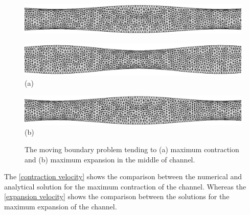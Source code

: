 \begin{figure}[H]
\begin{minipage}{.50\linewidth}
     \end{minipage}%
     \begin{minipage}{.50\linewidth}
      \centering
      \includegraphics[scale=0.16]{./02_chaps/cap_validation/figure/ext2.png}\\
     \end{minipage}
     \begin{minipage}{.50\linewidth}
     \medskip
      \centering
      \includegraphics[scale=0.16]{./02_chaps/cap_validation/figure/comp3.png}\\
     (a)
     \end{minipage}%
     \begin{minipage}{.50\linewidth}
     \medskip
      \centering
      \includegraphics[scale=0.16]{./02_chaps/cap_validation/figure/ext3.png}\\
     (b)
     \end{minipage}
     \medskip
     \caption{
The moving boundary problem tending to  
     (a) maximum contraction and
     (b) maximum expansion
in the middle of channel.
}
     \label{moving boundary fig}
\end{figure}




\medskip
The \ref{contraction velocity} shows the comparison between the 
numerical and analytical solution for the maximum contraction 
of the channel. Whereas the \ref{expansion velocity} 
shows the comparison between the solutions for 
the maximum expansion of the channel.

